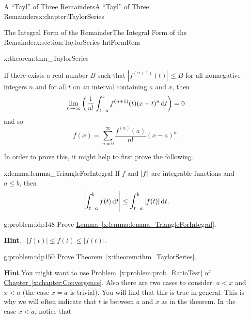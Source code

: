 \begin{chapterptx}{A ``Tayl'' of Three Remainders}{}{A ``Tayl'' of Three Remainders}{}{}{x:chapter:TaylorSeries}
\begin{sectionptx}{The Integral Form of the Remainder}{}{The Integral Form of the Remainder}{}{}{x:section:TaylorSeries-IntFormRem}
		\begin{theorem}{}{}{x:theorem:thm_TaylorSeries}%
			\par
			 If there exists a real number \(B\) such that \(|f^{(n+1)}(t)|\leq B\) for all nonnegative integers \(n\) and for all \(t\) on an interval containing \(a\) and \(x\), then%
			\begin{equation*}
				\lim_{n\rightarrow\infty}\left(\frac{1}{n!}\int_{t=a}^xf^{(n+1)}(t)(x-t)^n\,{\rm d} t\right)=0
			\end{equation*}
			and so%
			\begin{equation*}
				f(x)=\sum_{n=0}^\infty\frac{f^{(n)}(a)}{n!}(x-a)^n.{}
			\end{equation*}
		\end{theorem}
		In order to prove this, it might help to first prove the following.%
		\begin{lemma}{}{}{x:lemma:lemma_TriangleForIntegral}%
			If \(f\) and \(\left|f\right|\) are integrable functions and \(a\leq b\), then%
			\begin{equation*}
				\left|\int_{t=a}^bf(t)\,{\rm d} t\right|\leq\int_{t=a}^b|f(t)|\,{\rm d} t. {}
			\end{equation*}
		\end{lemma}
		\begin{problem}{}{g:problem:idp148}%
			 Prove \hyperref[x:lemma:lemma_TriangleForIntegral]{Lemma~{\xreffont\ref{x:lemma:lemma_TriangleForIntegral}}}.%
			\par\smallskip%
			\noindent\textbf{\blocktitlefont Hint}.\hypertarget{g:hint:idp149}{}\quad{}\(-|f(t)|\leq f(t)\leq|f(t)|\).%
		\end{problem}
		\begin{problem}{}{g:problem:idp150}%
			 Prove \hyperref[x:theorem:thm_TaylorSeries]{Theorem~{\xreffont\ref{x:theorem:thm_TaylorSeries}}}.%
			\par\smallskip%
			\noindent\textbf{\blocktitlefont Hint}.\hypertarget{g:hint:idp151}{}\quad{}You might want to use \hyperref[x:problem:prob_RatioTest]{Problem~{\xreffont\ref{x:problem:prob_RatioTest}}} of \hyperref[x:chapter:Convergence]{Chapter~{\xreffont\ref{x:chapter:Convergence}}}.  Also there are two cases to consider: \(a\lt x\) and \(x\lt a\) (the case \(x=a\) is trivial).  You will find that this is true in general.  This is why we will often indicate that \(t\) is between \(a\) and \(x\) as in the theorem.  In the case \(x\lt a\), notice that%

\end{problem}
\end{sectionptx}
\end{chapterptx}
